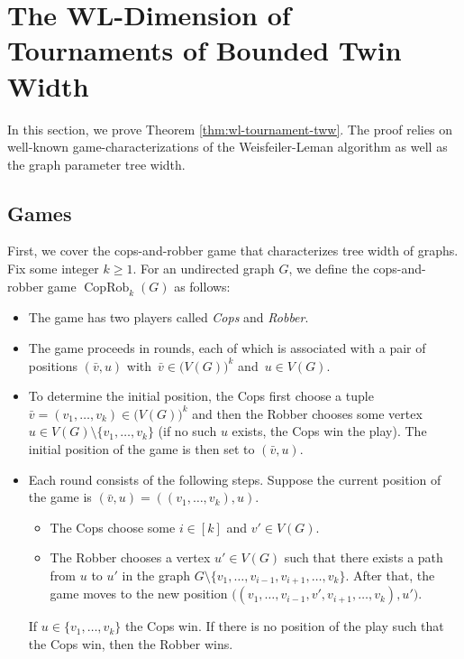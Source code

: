 \PassOptionsToPackage{dvipsnames,svgnames}{xcolor}\documentclass[10pt,a4paper]{article}
\DeclareMathOperator{\CopRob}{CopRob}
\begin{document}
\section{The WL-Dimension of Tournaments of Bounded Twin Width}
\label{sec:wl}

In this section, we prove Theorem \ref{thm:wl-tournament-tww}.
The proof relies on well-known game-characterizations of the Weisfeiler-Leman algorithm as well as the graph parameter tree width.

\subsection{Games}

First, we cover the cops-and-robber game that characterizes tree width of graphs.
Fix some integer $k \geq 1$.
For an undirected graph $G$, we define the cops-and-robber game $\CopRob_k(G)$ as follows:

\begin{itemize}
 \item The game has two players called \emph{Cops} and \emph{Robber}.
 \item The game proceeds in rounds, each of which is associated with a pair of positions
 $(\bar v,u)$ with~$\bar v \in \big(V(G)\big)^k$ and~$u \in V(G)$.
 \item To determine the initial position, the Cops first choose a tuple $\bar v = (v_1,\dots,v_k) \in \big(V(G)\big)^k$ and then the Robber chooses some vertex $u \in V(G) \setminus \{v_1,\dots,v_k\}$ (if no such $u$ exists, the Cops win the play).
  The initial position of the game is then set to $(\bar v,u)$.
 \item Each round consists of the following steps.
  Suppose the current position of the game is $(\bar v,u) = ((v_1,\dots,v_k),u)$.
  \begin{itemize}
   \item[(C)] The Cops choose some $i \in [k]$ and $v' \in V(G)$.
   \item[(R)] The Robber chooses a vertex $u' \in V(G)$ such that there exists a path from $u$ to $u'$ in the graph $G \setminus \{v_1,\dots,v_{i-1},v_{i+1},\dots,v_k\}$.
    After that, the game moves to the new position $\big((v_1,\dots,v_{i-1},v',v_{i+1},\dots,v_k), u'\big)$.
  \end{itemize}

  If $u \in \{v_1,\dots,v_k\}$ the Cops win.
  If there is no position of the play such that the Cops win, then the Robber wins.
\end{itemize}
\end{document}
